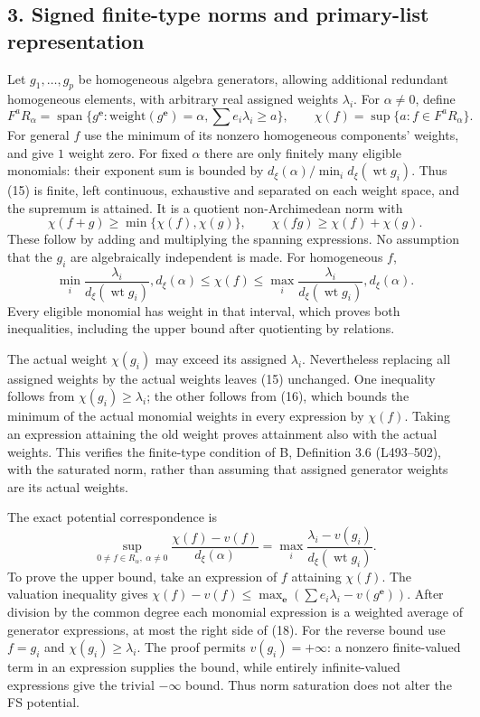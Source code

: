 \documentclass[
  11pt,
]{article}
\begin{document}
\subsection{3. Signed finite-type norms and primary-list
representation}\label{signed-finite-type-norms-and-primary-list-representation}

Let \(g_1,\ldots,g_p\) be homogeneous algebra generators, allowing
additional redundant homogeneous elements, with arbitrary real assigned
weights \(\lambda_i\). For \(\alpha\ne0\), define \[
 F^a R_\alpha=\operatorname{span}\{g^{\mathbf e}:
              \text{weight}(g^{\mathbf e})=\alpha,
              \sum e_i\lambda_i\geq a\},\qquad
 \chi(f)=\sup\{a:f\in F^a R_\alpha\}.                \tag{15}
\] For general \(f\) use the minimum of its nonzero homogeneous
components' weights, and give \(1\) weight zero. For fixed \(\alpha\)
there are only finitely many eligible monomials: their exponent sum is
bounded by \(d_\xi(\alpha)/\min_i d_\xi(\operatorname{wt}g_i)\). Thus
(15) is finite, left continuous, exhaustive and separated on each weight
space, and the supremum is attained. It is a quotient non-Archimedean
norm with \[
 \chi(f+g)\geq\min\{\chi(f),\chi(g)\},\qquad
 \chi(fg)\geq\chi(f)+\chi(g).                        \tag{16}
\] These follow by adding and multiplying the spanning expressions. No
assumption that the \(g_i\) are algebraically independent is made. For
homogeneous \(f\), \[
 \min_i\frac{\lambda_i}{d_\xi(\operatorname{wt}g_i)},d_\xi(\alpha)
 \leq\chi(f)\leq
 \max_i\frac{\lambda_i}{d_\xi(\operatorname{wt}g_i)},d_\xi(\alpha).
 \tag{17}
\] Every eligible monomial has weight in that interval, which proves
both inequalities, including the upper bound after quotienting by
relations.

The actual weight \(\chi(g_i)\) may exceed its assigned \(\lambda_i\).
Nevertheless replacing all assigned weights by the actual weights leaves
(15) unchanged. One inequality follows from \(\chi(g_i)\geq\lambda_i\);
the other follows from (16), which bounds the minimum of the actual
monomial weights in every expression by \(\chi(f)\). Taking an
expression attaining the old weight proves attainment also with the
actual weights. This verifies the finite-type condition of B, Definition
3.6 (L493--502), with the saturated norm, rather than assuming that
assigned generator weights are its actual weights.

The exact potential correspondence is \[
 \sup_{0\ne f\in R_\alpha,\ \alpha\ne0}
 \frac{\chi(f)-v(f)}{d_\xi(\alpha)}
 =\max_i\frac{\lambda_i-v(g_i)}{d_\xi(\operatorname{wt}g_i)}.
 \tag{18}
\] To prove the upper bound, take an expression of \(f\) attaining
\(\chi(f)\). The valuation inequality gives
\(\chi(f)-v(f)\leq\max_{\mathbf e}(\sum e_i\lambda_i-v(g^{\mathbf e}))\).
After division by the common degree each monomial expression is a
weighted average of generator expressions, at most the right side of
(18). For the reverse bound use \(f=g_i\) and
\(\chi(g_i)\geq\lambda_i\). The proof permits \(v(g_i)=+\infty\): a
nonzero finite-valued term in an expression supplies the bound, while
entirely infinite-valued expressions give the trivial \(-\infty\) bound.
Thus norm saturation does not alter the FS potential.
\end{document}
